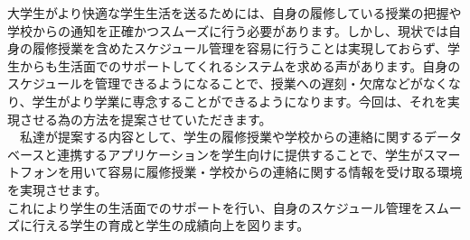 大学生がより快適な学生生活を送るためには、自身の履修している授業の把握や学校からの通知を正確かつスムーズに行う必要があります。しかし、現状では自身の履修授業を含めたスケジュール管理を容易に行うことは実現しておらず、学生からも生活面でのサポートしてくれるシステムを求める声があります。自身のスケジュールを管理できるようになることで、授業への遅刻・欠席などがなくなり、学生がより学業に専念することができるようになります。今回は、それを実現させる為の方法を提案させていただきます。\\
　私達が提案する内容として、学生の履修授業や学校からの連絡に関するデータベースと連携するアプリケーションを学生向けに提供することで、学生がスマートフォンを用いて容易に履修授業・学校からの連絡に関する情報を受け取る環境を実現させます。\\
これにより学生の生活面でのサポートを行い、自身のスケジュール管理をスムーズに行える学生の育成と学生の成績向上を図ります。

